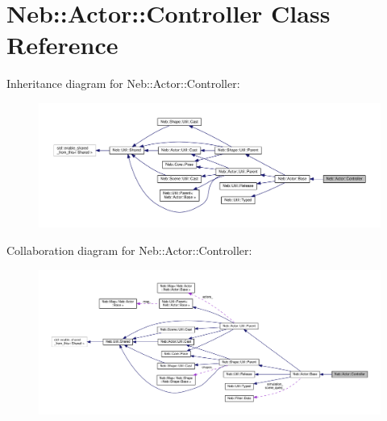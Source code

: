 \hypertarget{classNeb_1_1Actor_1_1Controller}{\section{Neb\-:\-:Actor\-:\-:Controller Class Reference}
\label{classNeb_1_1Actor_1_1Controller}
}


Inheritance diagram for Neb\-:\-:Actor\-:\-:Controller\-:
\nopagebreak
\begin{figure}[H]
\begin{center}
\leavevmode
\includegraphics[width=350pt]{classNeb_1_1Actor_1_1Controller__inherit__graph}
\end{center}
\end{figure}


Collaboration diagram for Neb\-:\-:Actor\-:\-:Controller\-:
\nopagebreak
\begin{figure}[H]
\begin{center}
\leavevmode
\includegraphics[width=350pt]{classNeb_1_1Actor_1_1Controller__coll__graph}
\end{center}
\end{figure}
